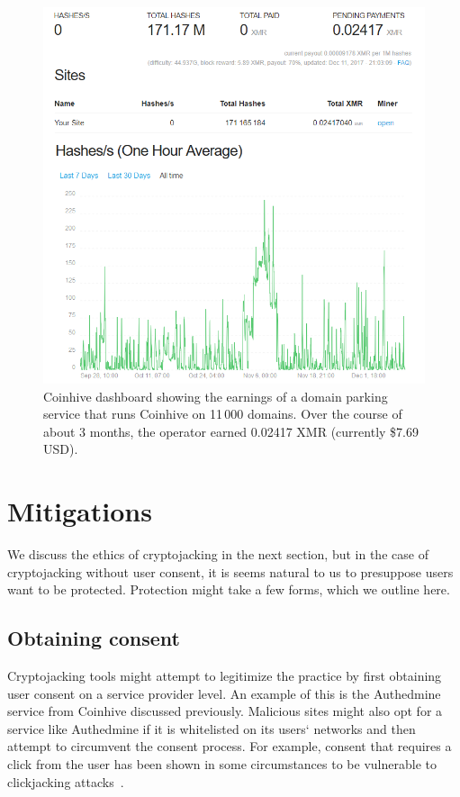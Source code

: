 \begin{figure}[t]
\centering
\includegraphics[width=\linewidth]{figures/experiment_coinhive_results.png}
\caption{Coinhive dashboard showing the earnings of a domain parking service that runs Coinhive on 11\,000 domains. Over the course of about 3 months, the operator earned 0.02417 XMR (currently \$7.69 USD).}\label{fig:domain1}
\end{figure}



\section{Mitigations}

We discuss the ethics of cryptojacking in the next section, but in the case of cryptojacking without user consent, it is seems natural to us to presuppose users want to be protected. Protection might take a few forms, which we outline here.

\subsection{Obtaining consent}

Cryptojacking tools might attempt to legitimize the practice by first obtaining user consent on a service provider level. An example of this is the Authedmine service from Coinhive discussed previously. Malicious sites might also opt for a service like Authedmine if it is whitelisted on its users` networks and then attempt to circumvent the consent process. For example, consent that requires a click from the user has been shown in some circumstances to be vulnerable to clickjacking attacks~\cite{rydstedt2010busting}.

